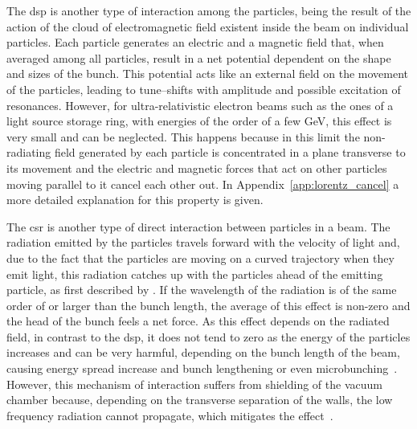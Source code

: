     The \gls{dsp} is another type of interaction among the particles, being the result of the action of the cloud of electromagnetic field existent inside the beam on individual particles. Each particle generates an electric and a magnetic field that, when averaged among all particles, result in a net potential dependent on the shape and sizes of the bunch. This potential acts like an external field on the movement of the particles, leading to tune--shifts with amplitude and possible excitation of resonances. However, for ultra-relativistic electron beams such as the ones of a light source storage ring, with energies of the order of a few \si{\giga\electronvolt}, this effect is very small and can be neglected. This happens because in this limit the non-radiating field generated by each particle is concentrated in a plane transverse to its movement and the electric and magnetic forces that act on other particles moving parallel to it cancel each other out. In Appendix~\ref{app:lorentz_cancel} a more detailed explanation for this property is given.

    The \gls{csr} is another type of direct interaction between particles in a beam. The radiation emitted by the particles travels forward with the velocity of light and, due to the fact that the particles are moving on a curved trajectory when they emit light, this radiation catches up with the particles ahead of the emitting particle, as first described by . If the wavelength of the radiation is of the same order of or larger than the bunch length, the average of this effect is non-zero and the head of the bunch feels a net force. As this effect depends on the radiated field, in contrast to the \gls{dsp}, it does not tend to zero as the energy of the particles increases and can be very harmful, depending on the bunch length of the beam, causing energy spread increase and bunch lengthening or even microbunching~\cite{Bane2010}. However, this mechanism of interaction suffers from shielding of the vacuum chamber because, depending on the transverse separation of the walls, the low frequency radiation cannot propagate, which mitigates the effect~\cite{Murphy1997}.

